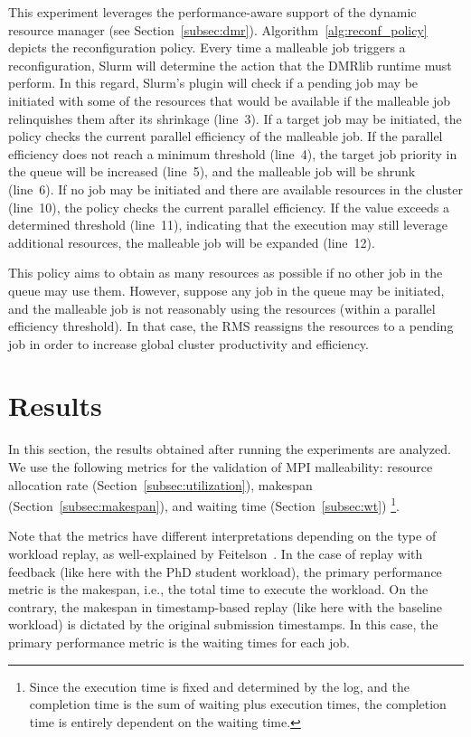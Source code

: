 \documentclass[a4paper,fleqn]{cas-dc}
\begin{document}
\begin{enumerate}[wide]
    This experiment leverages the performance-aware support of the dynamic resource manager (see Section~\ref{subsec:dmr}). 
    Algorithm~\ref{alg:reconf_policy} depicts the reconfiguration policy.
    Every time a malleable job triggers a reconfiguration, Slurm will determine the action that the DMRlib runtime must perform.
    In this regard, Slurm's plugin will check if a pending job may be initiated with some of the resources that would be available if the malleable job relinquishes them after its shrinkage (line~3).
    If a target job may be initiated, the policy checks the current parallel efficiency of the malleable job.
    If the parallel efficiency does not reach a minimum threshold (line~4), the target job priority in the queue will be increased (line~5), and the malleable job will be shrunk (line~6).
    If no job may be initiated and there are available resources in the cluster (line~10), the policy checks the current parallel efficiency. If the value exceeds a determined threshold (line~11), indicating that the execution may still leverage additional resources, the malleable job will be expanded (line~12).

    This policy aims to obtain as many resources as possible if no other job in the queue may use them. However, suppose any job in the queue may be initiated, and the malleable job is not reasonably using the resources (within a parallel efficiency threshold). In that case, the RMS reassigns the resources to a pending job in order to increase global cluster productivity and efficiency.
\end{enumerate}

\section{Results}
\label{sec:results}
In this section, the results obtained after running the experiments are analyzed.
We use the following metrics for the validation of MPI malleability: resource allocation rate (Section~\ref{subsec:utilization}), makespan (Section~\ref{subsec:makespan}), and waiting time (Section~\ref{subsec:wt})%
\footnote{
Since the execution time is fixed and determined by the log, and the completion time is the sum of waiting plus execution times, the completion time is entirely dependent on the waiting time.
}.

Note that the metrics have different interpretations depending on the type of workload replay, as well-explained by Feitelson~\cite{feitelson_resampling_2021}.
In the case of replay with feedback (like here with the PhD student workload),
the primary performance metric is the makespan, 
i.e., the total time to execute the workload.
On the contrary, the makespan in timestamp-based replay (like here with the baseline workload)
is dictated by the original submission timestamps.
In this case, the primary performance metric is the waiting times for each job.
\end{document}

